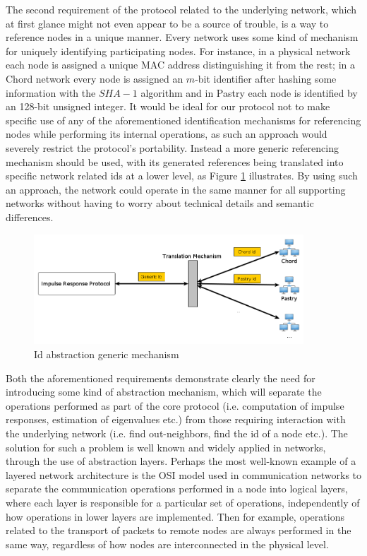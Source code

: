 \documentclass[a4paper,11pt,twoside]{report}
\begin{document}
The second requirement of the protocol related to the underlying network, which at first glance might not even appear to be a source of trouble, is a way to reference nodes in a unique manner. Every network uses some kind of mechanism for uniquely identifying participating nodes. For instance, in a physical network each node is assigned a unique MAC address distinguishing it from the rest; in a Chord network every node is assigned an $m$-bit identifier after hashing some information with the $SHA-1$ algorithm and in Pastry each node is identified by an 128-bit unsigned integer. It would be ideal for our protocol not to make specific use of any of the aforementioned identification mechanisms for referencing nodes while performing its internal operations, as such an approach would severely restrict the protocol's portability. Instead a more generic referencing mechanism should be used, with its generated references being translated into specific network related ids at a lower level, as Figure \ref{fig:id_mechanism} illustrates. By using such an approach, the network could operate in the same manner for all supporting networks without having to worry about technical details and semantic differences.\\ 


\begin{figure}[h]
\centering
\includegraphics[width=0.9\textwidth]{../figures/id_mechanism.png}
\caption{Id abstraction generic mechanism}
\label{fig:id_mechanism}
\end{figure}


Both the aforementioned requirements demonstrate clearly the need for introducing some kind of abstraction mechanism, which will separate the operations performed as part of the core protocol (i.e. computation of impulse responses, estimation of eigenvalues etc.) from those requiring interaction with the underlying network (i.e. find out-neighbors, find the id of a node etc.). The solution for such a problem is well known and widely applied in networks, through the use of abstraction layers. Perhaps the most well-known example of a layered network architecture is the OSI model \cite{citeulike:915718} used in communication networks to separate the communication operations performed in a node into logical layers, where each layer is responsible for a particular set of operations, independently of how operations in lower layers are implemented. Then for example, operations related to the transport of packets to remote nodes are always performed in the same way, regardless of how nodes are interconnected in the physical level. \\
\end{document}
